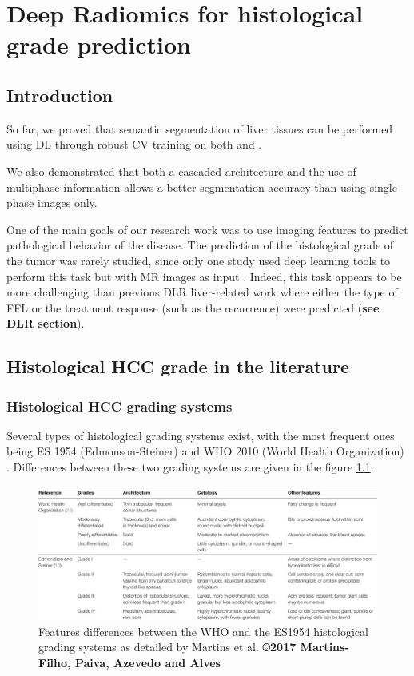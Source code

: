 

\chapter{Deep Radiomics for histological grade prediction}

\section{Introduction}\label{introduction}

So far, we proved that semantic segmentation of liver tissues can be
performed using DL through robust CV training on both  and
.

We also demonstrated that both a cascaded architecture and the use of
multiphase information allows a better segmentation accuracy than using
single phase images only.

One of the main goals of our research work was to use imaging features
to predict pathological behavior of the disease. The prediction of the
histological grade of the tumor was rarely studied, since only one study
used deep learning tools to perform this task but with MR images as
input \cite{Yang2019}.
Indeed, this task appears to be more challenging than previous DLR
liver-related work where either the type of FFL or the treatment
response (such as the recurrence) were predicted (\textbf{see DLR section}).

\section{Histological HCC grade in the literature
}\label{histological-hcc-grade-in-the-literature}

\subsection{Histological HCC grading
systems}\label{histological-hcc-grading-systems}

Several types of histological grading systems exist, with the most
frequent ones being ES 1954 (Edmonson-Steiner) \cite{EdmondsonHA1954}
and WHO 2010 (World Health Organization) \cite{20113051318}. Differences between these two
grading systems are given in the figure \ref{fig:martins2017_table1}.

\begin{figure}[th!]
\centering
\includegraphics[width=0.9\linewidth]{images/martins2017_table1}
\caption{Features differences between the WHO and the ES1954 histological grading systems as detailed by Martins et al. \cite{Martins2017} \textbf{©2017 Martins-Filho, Paiva, Azevedo and Alves}}
\label{fig:martins2017_table1}
\end{figure}

